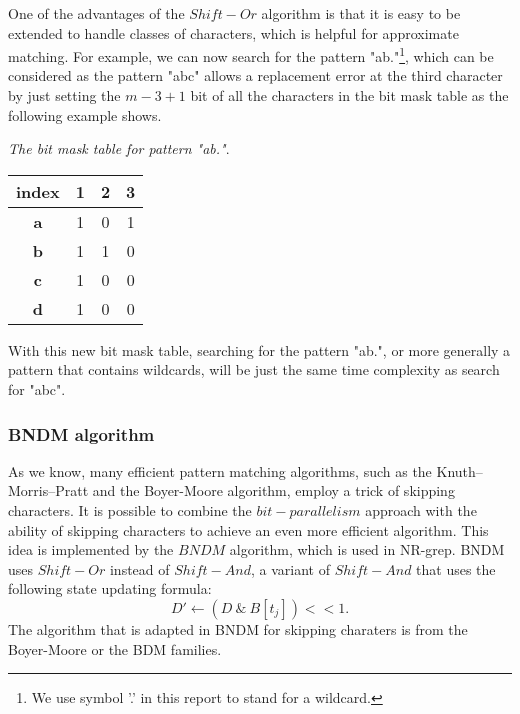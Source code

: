 One of the advantages of the $Shift-Or$ algorithm is that it is easy to be extended to handle classes of characters, which is helpful for approximate matching. 
For example, we can now search for the pattern "ab."\footnote{ We use symbol '.' in this report to stand for a wildcard.}, which can be considered as the pattern "abc" allows a replacement error at the third character by just setting the $m-3+1$ bit of all the characters in the bit mask table as the following example shows. 

\begin{example}\emph{The bit mask table for pattern "ab."}.
	\begin{table}[H]
		\centering
		\begin{tabular}{|c|c|c|c|}
			\hline
			index      & 1                        & 2                        & 3                        \\ \hline
			\textbf{a} & {\color{red} 1}                   & 0                        & {\color[HTML]{3531FF} 1} \\ \hline
			\textbf{b} &  {\color{red} 1}                    & {\color[HTML]{3531FF} 1} & 0                        \\ \hline
			\textbf{c} & {\color[HTML]{3531FF} 1} & 0                        & 0                        \\ \hline
			\textbf{d} &{\color{red} 1}                    & 0                        & 0                        \\ \hline
		\end{tabular}
		\label{table-bitmask2}
	\end{table}
\end{example}

With this new bit mask table, searching for the pattern "ab.", or more generally a pattern that contains wildcards, will be just the same time complexity as search for "abc". 
 
\subsubsection{BNDM algorithm}
As we know, many efficient pattern matching algorithms, such as the Knuth–Morris–Pratt and the Boyer-Moore algorithm, employ a trick of skipping characters. It is possible to combine the $bit-parallelism$ approach with the ability of skipping characters to achieve an even more efficient algorithm. This idea is implemented by the $BNDM$ algorithm, which is used in NR-grep. BNDM uses $Shift-Or$ instead of $Shift-And$, a variant of $Shift-And$ that uses the following state updating formula:  
$$ D' \leftarrow  (D \ \& \ B[t_j]) << 1 .$$ The algorithm that is adapted in BNDM for skipping charaters is from the Boyer-Moore or the BDM families\cite{crochemore94}.


